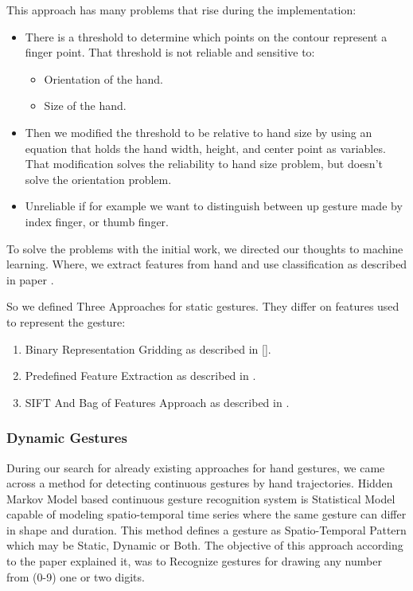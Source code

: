 This approach has many problems that rise during the implementation:\bigskip


\begin{itemize}
\item There is a threshold to determine which points on the contour represent a finger point. That threshold is not reliable and sensitive to:
\begin{itemize}
\item Orientation of the hand.
\item Size of the hand.
\end{itemize}
\item Then we modified the threshold to be relative to hand size by using an equation that holds the hand width, height, and center point as variables.
That modification solves the reliability to hand size problem, but doesn't solve the orientation problem.
\item Unreliable if for example we want to distinguish between up gesture made by index finger, or thumb finger.
\end{itemize}
\bigskip

To solve the problems with the initial work, we directed our thoughts to machine learning. Where, we extract features from hand and use classification as described in paper \cite{relatedsg6}.
\bigskip

So we defined Three Approaches for static gestures. They differ on features used to represent the gesture:
\begin{enumerate}
\item Binary Representation Gridding as described in [].
\item Predefined Feature Extraction as described in \cite{paper2sT}.
\item SIFT And Bag of Features Approach as described in \cite{dardas}.
\end{enumerate}
\bigskip

\subsubsection{Dynamic Gestures} 
During our search for already existing approaches for hand gestures, we came across a method 
for detecting continuous gestures by hand trajectories. Hidden Markov Model based \cite{hoda} 
continuous gesture recognition system is Statistical Model capable of modeling spatio-temporal 
time series where the same gesture can differ in shape and duration. This method defines a 
gesture as Spatio-Temporal Pattern which may be Static, Dynamic or Both. The objective of 
this approach according to the paper explained it, was to Recognize gestures for drawing any 
number from (0-9) one or two digits.
\bigskip

